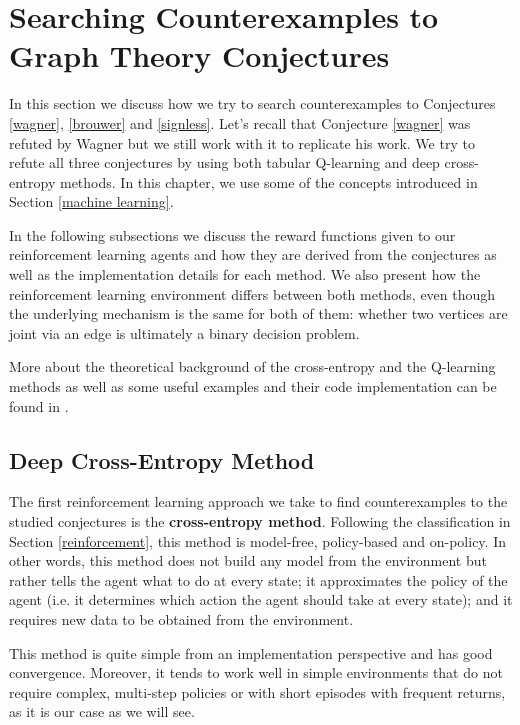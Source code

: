 \documentclass[11pt]{article}
\theoremstyle{definition}
\begin{document}
\newpage

\section{Searching Counterexamples to Graph Theory Conjectures} \label{implementation} 

In this section we discuss how we try to search counterexamples to Conjectures \ref{wagner}, \ref{brouwer} and \ref{signless}. Let's recall that Conjecture \ref{wagner} was refuted by Wagner but we still work with it to replicate his work. We try to refute all three conjectures by using both tabular Q-learning and deep cross-entropy methods. In this chapter, we use some of the concepts introduced in Section \ref{machine learning}.

In the following subsections we discuss the reward functions given to our reinforcement learning agents and how they are derived from the conjectures as well as the implementation details for each method. We also present how the reinforcement learning environment differs between both methods, even though the underlying mechanism is the same for both of them: whether two vertices are joint via an edge is ultimately a binary decision problem. 

More about the theoretical background of the cross-entropy and the Q-learning methods as well as some useful examples and their code implementation can be found in \cite{Lapan:2020}.

\subsection{Deep Cross-Entropy Method}

The first reinforcement learning approach we take to find counterexamples to the studied conjectures is the \textbf{cross-entropy method}. Following the classification in Section \ref{reinforcement}, this method is model-free, policy-based and on-policy. In other words, this method does not build any model from the environment but rather tells the agent what to do at every state; it approximates the policy of the agent (i.e. it determines which action the agent should take at every state); and it requires new data to be obtained from the environment.

This method is quite simple from an implementation perspective and has good convergence. Moreover, it tends to work well in simple environments that do not require complex, multi-step policies or with short episodes with frequent returns, as it is our case as we will see.
\end{document}
